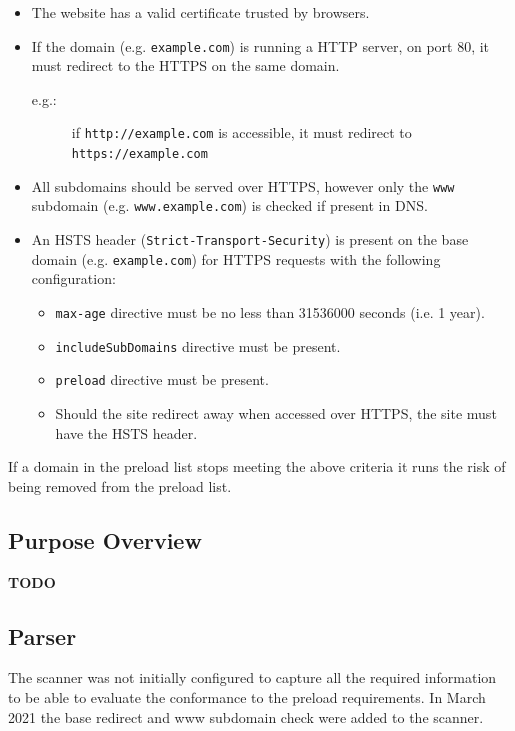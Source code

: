 \documentclass{mscreport}
\begin{document}
\begin{itemize}
  \setlength\itemsep{0.1em}
  \item The website has a valid certificate trusted by browsers.
  \item If the domain (e.g. \texttt{example.com}) is running a HTTP server, on port 80, it must redirect to the HTTPS on the same domain.
  \begin{description}
  \item[e.g.:] if \texttt{http://example.com} is accessible, it must redirect to \texttt{https://example.com}
  \end{description}
  \item All subdomains should be served over HTTPS, however only the \texttt{www} subdomain (e.g. \texttt{www.example.com}) is checked if present in DNS.
  \item An HSTS header (\texttt{Strict-Transport-Security}) is present on the base domain (e.g. \texttt{example.com}) for HTTPS requests with the following configuration:
  \begin{itemize}
    \item \texttt{max-age} directive must be no less than 31536000 seconds (i.e. 1 year).
    \item \texttt{includeSubDomains} directive must be present.
    \item \texttt{preload} directive must be present.
    \item Should the site redirect away when accessed over HTTPS, the site must have the HSTS header.
  \end{itemize} 
\end{itemize}

\vspace{0.3cm} \noindent
If a domain in the preload list stops meeting the above criteria it runs the risk of being removed from the preload list.

\subsection{Purpose Overview}

\textbf{TODO}

\subsection{Parser}

\noindent
The scanner was not initially configured to capture all the required information to be able to evaluate the conformance to the preload requirements. In March 2021 the base redirect and www subdomain check were added to the scanner.
\end{document}

